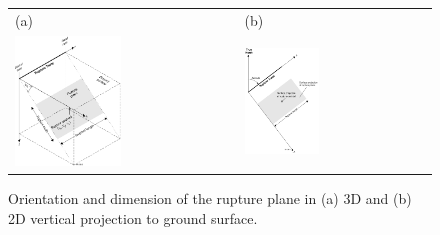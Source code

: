 \begin{figure}[htp]
\begin{center}
\begin{tabular}{ll}
(a) & (b) \\
\includegraphics[width=0.49\textwidth]{diags/fig-hrupture-3d} &
\includegraphics[width=0.41\textwidth]{diags/fig-hrupture-2d}
\end{tabular}
\end{center}
\caption{Orientation and dimension of the rupture plane in (a) 3D
and (b) 2D vertical projection to ground surface.}
\label{fig:hrupture-3d}
\end{figure}


